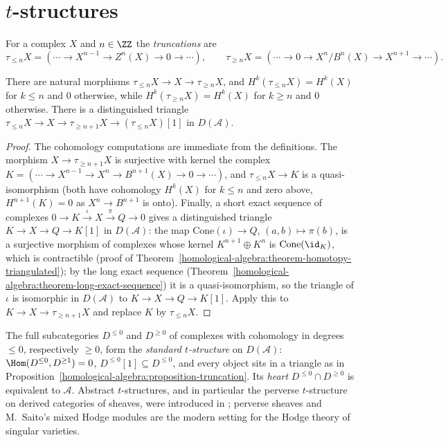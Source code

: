 \section{$t$-structures}\label{homological-algebra:section-t-structures}

\begin{definition}\label{homological-algebra:definition-truncation}
For a complex $X$ and $n \in \ZZ$ the \emph{truncations} are
\[
\tau_{\leq n}X = (\cdots \to X^{n-1} \to Z^n(X) \to 0 \to \cdots), \qquad
\tau_{\geq n}X = (\cdots \to 0 \to X^n/B^n(X) \to X^{n+1} \to \cdots).
\]
\end{definition}

\begin{proposition}\label{homological-algebra:proposition-truncation}
There are natural morphisms $\tau_{\leq n}X \to X \to \tau_{\geq n}X$, and $H^k(\tau_{\leq n}X) = H^k(X)$ for $k \leq n$ and $0$ otherwise, while
$H^k(\tau_{\geq n}X) = H^k(X)$ for $k \geq n$ and $0$ otherwise. There is a distinguished triangle
$\tau_{\leq n}X \to X \to \tau_{\geq n+1}X \to (\tau_{\leq n}X)[1]$ in $D(\mathcal{A})$.
\end{proposition}

\begin{proof}
The cohomology computations are immediate from the definitions. The morphism $X \to \tau_{\geq n+1}X$ is surjective with kernel the complex
$K = (\cdots \to X^{n-1} \to X^n \to B^{n+1}(X) \to 0 \to \cdots)$, and $\tau_{\leq n}X \to K$ is a quasi-isomorphism (both have cohomology $H^k(X)$ for
$k \leq n$ and zero above, $H^{n+1}(K) = 0$ as $X^n \to B^{n+1}$ is onto). Finally, a short exact sequence of complexes $0 \to K \xrightarrow{\iota} X \xrightarrow{\pi} Q \to 0$ gives a distinguished triangle
$K \to X \to Q \to K[1]$ in $D(\mathcal{A})$: the map $\mathrm{Cone}(\iota) \to Q$, $(a, b) \mapsto \pi(b)$, is a surjective morphism of complexes whose kernel
$K^{n+1} \oplus K^n$ is $\mathrm{Cone}(\id_K)$, which is contractible (proof of
Theorem~\ref{homological-algebra:theorem-homotopy-triangulated}); by the long exact sequence
(Theorem~\ref{homological-algebra:theorem-long-exact-sequence}) it is a quasi-isomorphism, so the triangle of $\iota$ is isomorphic in
$D(\mathcal{A})$ to $K \to X \to Q \to K[1]$. Apply this to $K \to X \to \tau_{\geq n+1}X$ and replace $K$ by $\tau_{\leq n}X$.
\end{proof}

\begin{remark}\label{homological-algebra:remark-t-structures}
The full subcategories $D^{\leq 0}$ and $D^{\geq 0}$ of complexes with cohomology in degrees $\leq 0$, respectively $\geq 0$, form the \emph{standard
$t$-structure} on $D(\mathcal{A})$: $\Hom(D^{\leq 0}, D^{\geq 1}) = 0$, $D^{\leq 0}[1] \subseteq D^{\leq 0}$, and every object sits in a triangle as in
Proposition~\ref{homological-algebra:proposition-truncation}. Its \emph{heart} $D^{\leq 0} \cap D^{\geq 0}$ is equivalent to $\mathcal{A}$. Abstract
$t$-structures, and in particular the perverse $t$-structure on derived categories of sheaves, were introduced in \cite{bbd}; perverse sheaves
and M.~Saito's mixed Hodge modules are the modern setting for the Hodge theory of singular varieties.
\end{remark}

